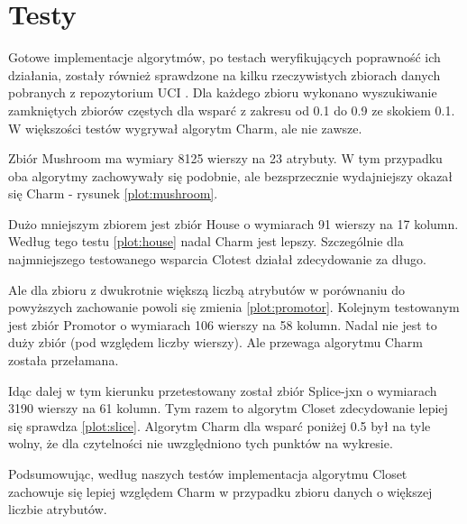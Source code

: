 \section{Testy}

Gotowe implementacje algorytmów, po testach weryfikujących poprawność ich działania, zostały również sprawdzone na kilku rzeczywistych zbiorach danych pobranych z repozytorium UCI \cite{UCI}.
Dla każdego zbioru wykonano wyszukiwanie zamkniętych zbiorów częstych dla wsparć z zakresu od 0.1 do 0.9 ze skokiem 0.1.
W większości testów wygrywał algorytm Charm, ale nie zawsze.

Zbiór Mushroom ma wymiary 8125 wierszy na 23 atrybuty. 
W tym przypadku oba algorytmy zachowywały się podobnie, ale bezsprzecznie wydajniejszy okazał się Charm - rysunek \ref{plot:mushroom}.

Dużo mniejszym zbiorem jest zbiór House o wymiarach 91 wierszy na 17 kolumn.
Według tego testu \ref{plot:house} nadal Charm jest lepszy. 
Szczególnie dla najmniejszego testowanego wsparcia Clotest działał zdecydowanie za długo.

Ale dla zbioru z dwukrotnie większą liczbą atrybutów w porównaniu do powyższych zachowanie powoli się zmienia \ref{plot:promotor}. Kolejnym testowanym jest zbiór Promotor o wymiarach 106 wierszy na 58 kolumn.
Nadal nie jest to duży zbiór (pod względem liczby wierszy).
Ale przewaga algorytmu Charm została przełamana.

Idąc dalej w tym kierunku przetestowany został zbiór Splice-jxn o wymiarach 3190 wierszy na 61 kolumn.
Tym razem to algorytm Closet zdecydowanie lepiej się sprawdza \ref{plot:slice}.
Algorytm Charm dla wsparć poniżej 0.5 był na tyle wolny, że dla czytelności nie uwzględniono tych punktów na wykresie.

Podsumowując, według naszych testów implementacja algorytmu Closet zachowuje się lepiej względem Charm w przypadku zbioru danych o większej liczbie atrybutów.

